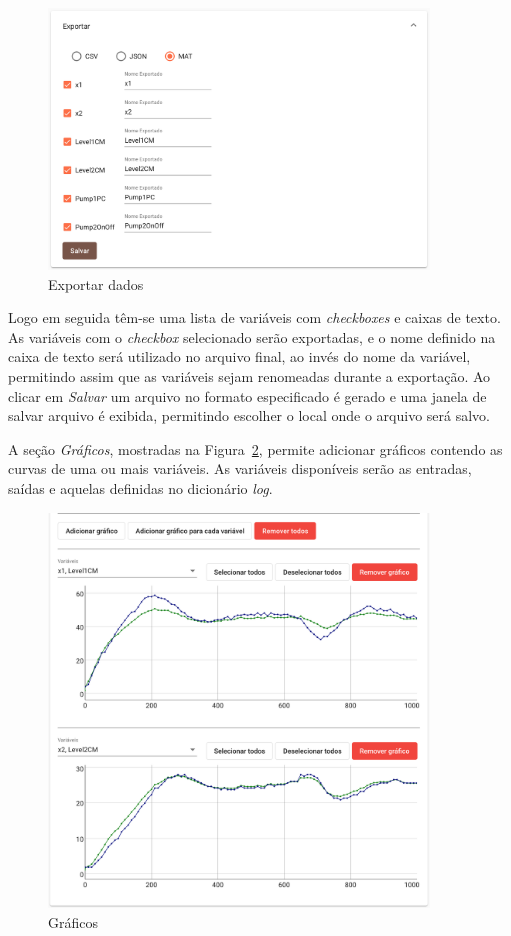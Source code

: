 \begin{figure}[ht!]
    \centering
    \includegraphics[width=0.9\textwidth]{imgs/graphs2}
    \caption[Exportar dados]{Exportar dados}%
    \label{fig:graphs2}
\end{figure}

Logo em seguida têm-se uma lista de variáveis com \textit{checkboxes} e caixas
de texto. As variáveis com o \textit{checkbox} selecionado serão exportadas, e o
nome definido na caixa de texto será utilizado no arquivo final, ao invés do
nome da variável, permitindo assim que as variáveis sejam renomeadas durante a
exportação. Ao clicar em \textit{Salvar} um arquivo no formato especificado é
gerado e uma janela de salvar arquivo é exibida, permitindo escolher o local
onde o arquivo será salvo.

A seção \textit{Gráficos}, mostradas na Figura~\ref{fig:graphs3}, permite
adicionar gráficos contendo as curvas de uma ou mais variáveis. As variáveis
disponíveis serão as entradas, saídas e aquelas definidas no dicionário
\textit{log}.

\begin{figure}[ht!]
    \centering
    \includegraphics[width=0.9\textwidth]{imgs/graphs3}
    \caption[Gráficos]{Gráficos}%
    \label{fig:graphs3}
\end{figure}

